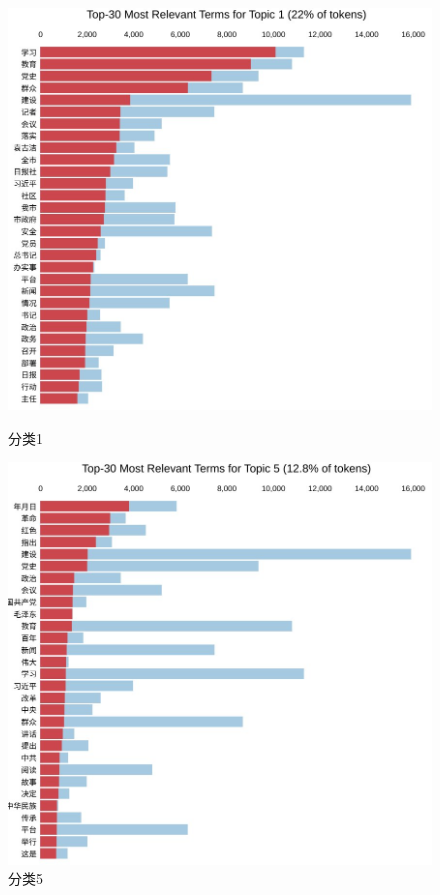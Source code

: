 \documentclass[bwprint]{gmcmthesis}
\begin{document}
\begin{figure}[H]
	\begin{minipage}{0.49\linewidth}
		\centering
		\includegraphics[width=0.9\linewidth]{figures/news3.png}
		\caption{分类1}
		\label{news3}%
	\end{minipage}
	\begin{minipage}{0.49\linewidth}
		\centering
		\includegraphics[width=0.9\linewidth]{figures/news4.png}
		\caption{分类5}
		\label{news4}%
	\end{minipage}
\end{figure}
\end{document}
